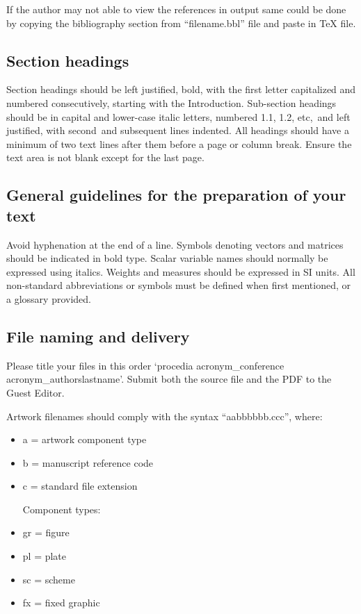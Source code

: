 \documentclass[5p,times,procedia]{elsarticle}
\begin{document}
If the author may not able to view the references in output same could be done by copying the bibliography section from ``filename.bbl'' file and paste in TeX file.



\subsection{Section headings}
Section headings should be left justified, bold, with the first letter capitalized and numbered consecutively, starting with the Introduction. Sub-section headings should be in capital and lower-case italic letters, numbered 1.1, 1.2, etc,~and left justified, with second~and subsequent lines indented. All headings should have a minimum of two text lines after them before a page or column break.
Ensure the text area is not blank except for the last page.

\subsection{General guidelines for the preparation of your text}
Avoid hyphenation at the end of a line. Symbols denoting vectors and matrices should be indicated in bold type. Scalar variable names should normally be expressed using italics. Weights and measures should be expressed in SI units. All non-standard abbreviations or symbols must be defined when first mentioned, or a glossary provided.

\subsection{File naming and delivery}
Please title your files in this order `procedia acronym\_conference acronym\_authorslastname'.  Submit both the source file and the PDF to the Guest Editor.

Artwork filenames should comply with the syntax ``aabbbbbb.ccc'', where:
\begin{itemize}
\item a = artwork component type
\item b = manuscript reference code
\item c = standard file extension

Component types:
\item gr = figure
\item pl = plate
\item sc = scheme
\item fx = fixed graphic
\end{itemize}
\end{document}
